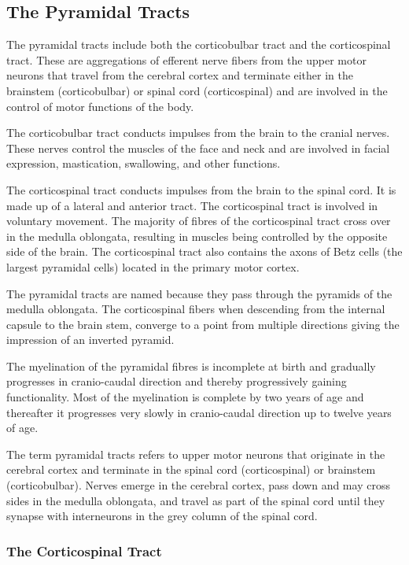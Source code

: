 \hypertarget{the-pyramidal-tracts}{%
\subsection{The Pyramidal Tracts}\label{the-pyramidal-tracts}}

The pyramidal tracts include both the corticobulbar tract and the corticospinal tract. These are aggregations of efferent nerve fibers from the upper motor neurons that travel from the cerebral cortex and terminate either in the brainstem (corticobulbar) or spinal cord (corticospinal) and are involved in the control of motor functions of the body.

The corticobulbar tract conducts impulses from the brain to the cranial nerves. These nerves control the muscles of the face and neck and are involved in facial expression, mastication, swallowing, and other functions.

The corticospinal tract conducts impulses from the brain to the spinal cord. It is made up of a lateral and anterior tract. The corticospinal tract is involved in voluntary movement. The majority of fibres of the corticospinal tract cross over in the medulla oblongata, resulting in muscles being controlled by the opposite side of the brain. The corticospinal tract also contains the axons of Betz cells (the largest pyramidal cells) located in the primary motor cortex.

The pyramidal tracts are named because they pass through the pyramids of the medulla oblongata. The corticospinal fibers when descending from the internal capsule to the brain stem, converge to a point from multiple directions giving the impression of an inverted pyramid.

The myelination of the pyramidal fibres is incomplete at birth and gradually progresses in cranio-caudal direction and thereby progressively gaining functionality. Most of the myelination is complete by two years of age and thereafter it progresses very slowly in cranio-caudal direction up to twelve years of age.

The term pyramidal tracts refers to upper motor neurons that originate in the cerebral cortex and terminate in the spinal cord (corticospinal) or brainstem (corticobulbar). Nerves emerge in the cerebral cortex, pass down and may cross sides in the medulla oblongata, and travel as part of the spinal cord until they synapse with interneurons in the grey column of the spinal cord.

\hypertarget{the-corticospinal-tract}{%
\subsubsection{The Corticospinal Tract}\label{the-corticospinal-tract}}

